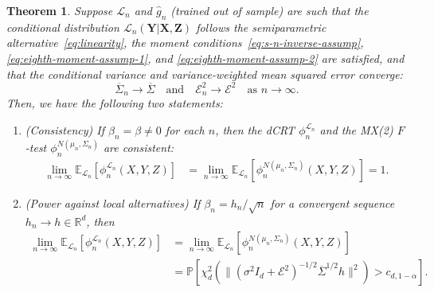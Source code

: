 \documentclass[ejs]{imsart}
\numberwithin{equation}{section}
\theoremstyle{plain}
\newtheorem{theorem}{Theorem}[section]
\theoremstyle{definition}
\theoremstyle{remark}
\newcommand{\prx}{\bm X}
\newcommand{\srx}{X}
\newcommand{\prz}{\bm Z}
\newcommand{\srz}{Z}
\newcommand{\pry}{{\bm Y}}
\newcommand{\sry}{Y}
\begin{document}
\begin{theorem}  \label{thm:power}
Suppose $\mathcal L_n$ and $\widehat g_n$ (trained out of sample) are such that the conditional distribution $\mathcal L_n(\pry|\prx, \prz)$ follows the semiparametric alternative~\eqref{eq:linearity}, the moment conditions~\eqref{eq:s-n-inverse-assump}, \eqref{eq:eighth-moment-assump-1}, and \eqref{eq:eighth-moment-assump-2} are satisfied, and that the conditional variance and variance-weighted mean squared error converge:
\begin{equation}
	\overline \Sigma_n \rightarrow \overline{\Sigma} \quad \text{and} \quad \mathcal E_n^2 \rightarrow \mathcal E^2 \quad \text{as } n \rightarrow \infty.
	\label{eq:limits}
\end{equation}
Then, we have the following two statements:
\begin{enumerate}
\item[(a)] (Consistency) If $\beta_n = \beta \neq 0$ for each $n$, then the dCRT $\phi_n^{\mathcal L_n}$ and the MX(2) $F$-test $\phi_n^{N(\mu_n, \Sigma_n)}$ are consistent:
\begin{equation}
	\begin{split}
		\lim_{n \rightarrow \infty} \mathbb E_{\mathcal L_n}\left[\phi_n^{\mathcal L_n}(\srx, \sry, \srz)\right] &= \lim_{n \rightarrow \infty} \mathbb E_{\mathcal L_n}\left[\phi_n^{N(\mu_n, \Sigma_n)}(\srx, \sry, \srz)\right] = 1.
		\label{eq:consistency}
	\end{split}
\end{equation}
\item[(b)] (Power against local alternatives) If $\beta_n = h_n/\sqrt{n}$ for a convergent sequence ${h_n \rightarrow h \in \mathbb R^d}$, then
\begin{equation}
	\begin{split}
			\lim_{n \rightarrow \infty} \mathbb E_{\mathcal L_n}\left[\phi_n^{\mathcal L_n}(\srx, \sry, \srz)\right] &= \lim_{n \rightarrow \infty} \mathbb E_{\mathcal L_n}\left[\phi_n^{N(\mu_n, \Sigma_n)}(\srx, \sry, \srz)\right] \\
		&= \mathbb P[\chi^2_d(\|(\sigma^2I_d +\mathcal E^2)^{-1/2}\overline \Sigma^{1/2} h\|^2) > c_{d,1-\alpha}].
		\label{eq:main-conclusion}
	\end{split}
\end{equation}
\end{enumerate}
\end{theorem}
\end{document}
